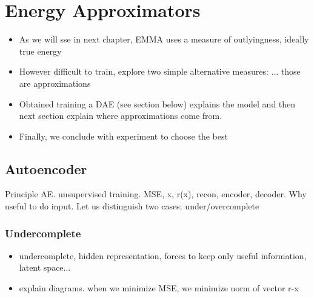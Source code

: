 \chapter{Energy Approximators} 
\label{chapter-4} 

\begin{itemize}
\item As we will sse in next chapter, EMMA uses a measure of outlyingness, ideally true energy
\item However difficult to train, explore two simple alternative measures: ... those are approximations
\item Obtained training a DAE (see section below) explains the model and then next section explain where approximations come from.
\item Finally, we conclude with experiment to choose the best
\end{itemize}


\section{Autoencoder}

Principle AE. unsupervised training. MSE, x, r(x), recon, encoder, decoder. Why useful to do input. Let us distinguish two cases: under/overcomplete

\subsection{Undercomplete}
\begin{itemize}
\item undercomplete, hidden representation, forces to keep only useful information, latent space...
\item explain diagrams. when we minimize MSE, we minimize norm of vector r-x
\end{itemize}

